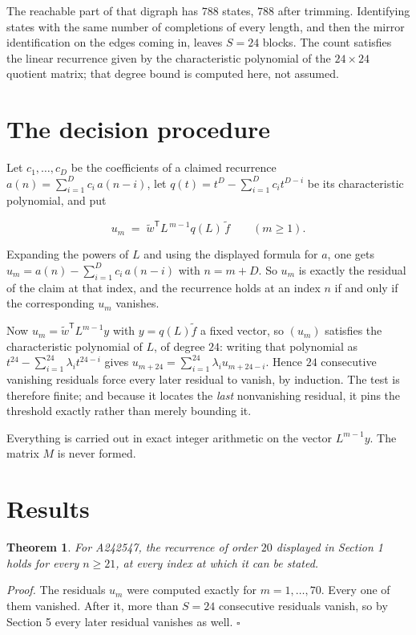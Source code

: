 \documentclass[11pt]{article}
\newtheorem{theorem}{Theorem}
\theoremstyle{definition}
\begin{document}
The reachable part of that digraph has $788$ states, $788$ after trimming. Identifying states with the same number of completions of every length, and then the mirror identification on the edges coming in, leaves $S = 24$ blocks. The count satisfies the linear recurrence given by the characteristic polynomial of the $24\times24$ quotient matrix; that degree bound is computed here, not assumed.

\section{The decision procedure}

Let $c_1,\dots,c_D$ be the coefficients of a claimed recurrence $a(n) = \sum_{i=1}^{D} c_i\,a(n-i)$, let $q(t) = t^{D} - \sum_{i=1}^{D} c_i t^{D-i}$ be its characteristic polynomial, and put

\[u_m \;=\; \tilde w^{\mathsf T} L^{\,m-1} q(L)\,\tilde f \qquad (m \ge 1).\]

Expanding the powers of $L$ and using the displayed formula for $a$, one gets $u_m = a(n) - \sum_{i=1}^{D} c_i\,a(n-i)$ with $n = m + D$. So $u_m$ is exactly the residual of the claim at that index, and the recurrence holds at an index $n$ if and only if the corresponding $u_m$ vanishes.

Now $u_m = \tilde w^{\mathsf T} L^{m-1} y$ with $y = q(L)\tilde f$ a fixed vector, so $(u_m)$ satisfies the characteristic polynomial of $L$, of degree $24$: writing that polynomial as $t^{24} - \sum_{i=1}^{24} \lambda_i t^{24-i}$ gives $u_{m+24} = \sum_{i=1}^{24} \lambda_i u_{m+24-i}$. Hence $24$ consecutive vanishing residuals force every later residual to vanish, by induction. The test is therefore finite; and because it locates the {\itshape last} nonvanishing residual, it pins the threshold exactly rather than merely bounding it.

Everything is carried out in exact integer arithmetic on the vector $L^{m-1}y$. The matrix $M$ is never formed.

\section{Results}

\begin{theorem} For A242547, the recurrence of order $20$ displayed in Section 1 holds for every $n \ge 21$, at every index at which it can be stated.\end{theorem}

{\itshape Proof.} The residuals $u_m$ were computed exactly for $m = 1,\dots,70$. Every one of them vanished. After it, more than $S = 24$ consecutive residuals vanish, so by Section 5 every later residual vanishes as well. $\square$
\end{document}
